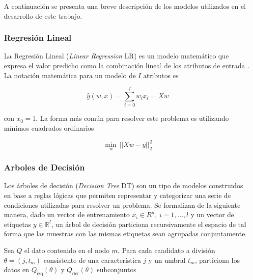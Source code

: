 \documentclass[spanish]{article}
\begin{document}
        A continuación se presenta una breve descripción de los modelos utilizados en el desarrollo 
        de este trabajo.
    
        \subsubsection{Regresión Lineal}
        
          La Regresión Lineal (\emph{Linear Regression} LR) es un modelo matemático que expresa el 
          valor predicho como la combinación lineal de los atributos de entrada \cite{seal1967studies}. 
          La notación matemática para un modelo de $I$ atributos es
      
          \begin{equation}
            \hat{y}(w, x) = \sum_{i=0}^{I} w_i x_i = Xw
          \end{equation}
          
          con $x_0=1$. La forma más común para resolver este problema es utilizando mínimos cuadrados 
          ordinarios
          
          \begin{equation}
            \underset{w}{\min\,} {|| X w - y||_2^2}
          \end{equation}
            
        \subsubsection{Arboles de Decisión}
        
          Los árboles de decisión (\emph{Decision Tree} DT) \cite{breimanolshen} son un tipo de modelos 
          construidos en base 
          a reglas lógicas que permiten representar y categorizar una serie de condiciones utilizadas 
          para resolver un problema. Se formalizan de la siguiente manera, dado un vector de entrenamiento 
          $x_i \in R^n, ~ i=1, ..., l$ y un vector de etiquetas $y \in \mathbb{R}^l$, un árbol de decisión
          particiona recursivamente el espacio de tal forma que las muestras con las mismas etiquetas 
          sean agrupadas conjuntamente. \medskip

          Sea $Q$ el dato contenido en el nodo $m$. Para cada candidato a división $\theta = (j, t_m)$ 
          consistente de una característica $j$ y un umbral $t_m$, particiona los datos en $Q_{\text{izq}}(\theta)$ 
          y $Q_{\text{der}}(\theta)$ subconjuntos
          
\end{document}
